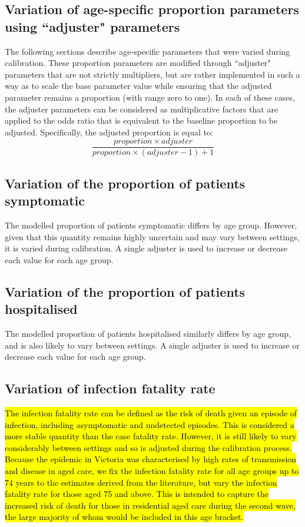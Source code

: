 \subsection{Variation of age-specific proportion parameters using ``adjuster" parameters}
The following sections describe age-specific parameters that were varied during calibration. These proportion parameters are modified through ``adjuster" parameters that are not strictly multipliers, but are rather implemented in such a way as to scale the base parameter value while ensuring that the adjusted parameter remains a proportion (with range zero to one). In each of these cases, the adjuster parameters can be considered as multiplicative factors that are applied to the odds ratio that is equivalent to the baseline proportion to be adjusted. Specifically, the adjusted proportion is equal to:
\[\frac{proportion \times adjuster}{proportion \times (adjuster-1)+1}\]

\subsection{Variation of the proportion of patients symptomatic}
The modelled proportion of patients symptomatic differs by age group. However, given that this quantity remains highly uncertain and may vary between settings, it is varied during calibration. A single adjuster is used to increase or decrease each value for each age group.

\subsection{Variation of the proportion of patients hospitalised}
The modelled proportion of patients hospitalised similarly differs by age group, and is also likely to vary between settings. A single adjuster is used to increase or decrease each value for each age group.

\subsection{Variation of infection fatality rate}
\hl{The infection fatality rate can be defined as the risk of death given an episode of infection, including asymptomatic and undetected episodes. This is considered a more stable quantity than the case fatality rate. However, it is still likely to vary considerably between settings and so is adjusted during the calibration process. Because the epidemic in Victoria was characterised by high rates of transmission and disease in aged care, we fix the infection fatality rate for all age groups up to 74 years to the estimates derived from the literature, but vary the infection fatality rate for those aged 75 and above. This is intended to capture the increased risk of death for those in residential aged care during the second wave, the large majority of whom would be included in this age bracket.}

